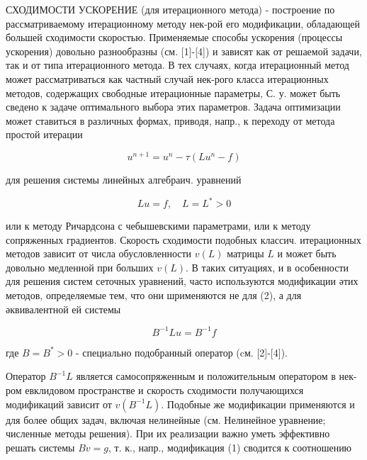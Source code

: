 \documentclass[10pt]{article}
\begin{document}
СХОДИМОСТИ УСКОРЕНИЕ (для итерационного метода) - построение по рассматриваемому итерационному методу нек-рой его модификации, обладающей большей сходимости скоростью. Применяемые способы ускорения (процессы ускорения) довольно разнообразны (см. [1]-[4]) и зависят как от решаемой задачи, так и от типа итерационного метода. В тех случаях, когда итерационный метод может рассматриваться как частный случай нек-рого класса итерационных методов, содержащих свободные итерационные параметры, С. у. может быть сведено к задаче оптимального выбора этих параметров. Задача оптимизации может ставиться в различных формах, приводя, напр., к переходу от метода простой итерации



\[

u^{n+1}=u^{n}-\tau\left(L u^{n}-f\right)

\]



для решения системы линейных алгебраич. уравнений



\[

L u=f, \quad L=L^{*}>0

\]



или к методу Ричардсона с чебышевскими параметрами, или к методу сопряженных градиентов. Скорость сходимости подобных классич. итерационных методов зависит от числа обусловленности $v(L)$ матрицы $L$ и может быть довольно медленной при больших $v(L)$. В таких ситуациях, и в особенности для решения систем сеточных уравнений, часто используются модификации әтих методов, определяемые тем, что они шрименяются не для (2), а для әквивалентной ей системы



\[

B^{-1} L u=B^{-1} f

\]



где $B=B^{*}>0$ - специально подобранный оператор (cм. [2]-[4]).



Оператор $B^{-1} L$ является самосопряженным и положительным оператором в нек-ром евклидовом пространстве и скорость сходимости получающихся модификаций зависит от $v\left(B^{-1} L\right)$. Подобные же модификации применяются и для более общих задач, включая нелинейные (см. Нелинейное уравнение; численные методы решения). При их реализации важно уметь эффективно решать системы $B v=g$, т. к., напр., модификация (1) сводится к соотношению
\end{document}
